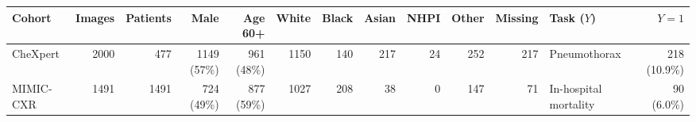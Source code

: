 \begin{tabular}{lrrrrrrrrrrlr}
\toprule
Cohort & Images & Patients & Male & Age 60+ & White & Black & Asian & NHPI & Other & Missing & Task ($Y$) & $Y{=}1$ \\
\midrule
CheXpert & 2000 & 477 & 1149 (57\%) & 961 (48\%) & 1150 & 140 & 217 & 24 & 252 & 217 & Pneumothorax & 218 (10.9\%) \\
MIMIC-CXR & 1491 & 1491 & 724 (49\%) & 877 (59\%) & 1027 & 208 & 38 & 0 & 147 & 71 & In-hospital mortality & 90 (6.0\%) \\
\bottomrule
\end{tabular}
